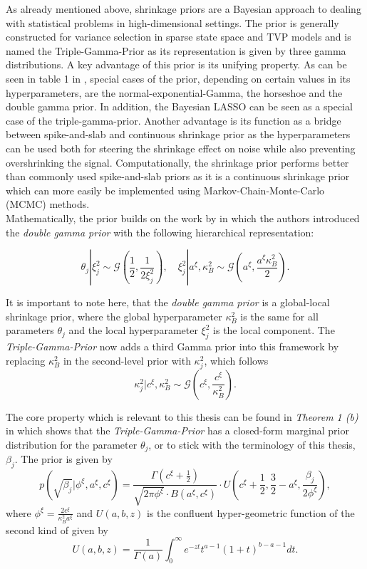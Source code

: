 \documentclass[12pt,a4paper]{article}
\begin{document}
As already mentioned above, shrinkage priors are a Bayesian approach to dealing with statistical problems in high-dimensional settings. The prior is generally constructed for variance selection in sparse state space and TVP models and is named the Triple-Gamma-Prior as its representation is given by three gamma distributions. A key advantage of this prior is its unifying property. As can be seen in table 1 in \textcite{TGP2020}, special cases of the prior, depending on certain values in its hyperparameters, are the normal-exponential-Gamma, the horseshoe and the double gamma prior. In addition, the Bayesian LASSO can be seen as a special case of the triple-gamma-prior. Another advantage is its function as a bridge between spike-and-slab and continuous shrinkage prior as the hyperparameters can be used both for steering the shrinkage effect on noise while also preventing overshrinking the signal. Computationally, the shrinkage prior performs better than commonly used spike-and-slab priors as it is a continuous shrinkage prior which can more easily be implemented using Markov-Chain-Monte-Carlo (MCMC) methods.\\ 

Mathematically, the prior builds on the work by \textcite{BittoFS2019} in which the authors introduced the \textit{double gamma prior} with the following hierarchical representation:

$$\theta_j|\xi^2_j \sim \mathcal{G}\left(\frac{1}{2}, \frac{1}{2\xi^2_j} \right), \quad \xi^2_j | a^\xi, \kappa^2_B \sim \mathcal{G}\left(a^\xi, \frac{a^\xi\kappa_B^2}{2}\right).$$

It is important to note here, that the \textit{double gamma prior} is a global-local shrinkage prior, where the global hyperparameter $\kappa^2_B$ is the same for all parameters $\theta_j$ and the local hyperparameter $\xi^2_j$ is the local component. The \textit{Triple-Gamma-Prior} now adds a third Gamma prior into this framework by replacing $\kappa_B^2$ in the second-level prior with $\kappa_j^2$, which follows
$$\kappa_j^2 | c^\xi, \kappa_B^2 \sim \mathcal{G}\left(c^\xi, \frac{c^\xi}{\kappa_B^2}\right).$$ 

The core property which is relevant to this thesis can be found in \textit{Theorem 1 (b)} in \textcite{TGP2020} which shows that the \textit{Triple-Gamma-Prior} has a closed-form marginal prior distribution for the parameter $\theta_j$, or to stick with the terminology of this thesis, $\beta_j$. The prior is given by
$$p(\sqrt{\beta_j}|\phi^\xi, a^\xi, c^\xi) = \frac{\Gamma(c^\xi + \frac{1}{2})}{\sqrt{2\pi \phi^\xi}\cdot B(a^\xi, c^\xi)}\cdot U\left(c^\xi + \frac{1}{2}, \frac{3}{2}-a^\xi, \frac{\beta_j}{2\phi^\xi}\right),$$
where $\phi^\xi = \frac{2c^\xi}{\kappa^2_Ba^\xi}$ and $U(a,b,z)$ is the confluent hyper-geometric function of the second kind of \textcite{Tricomi1947} given by
$$U(a,b,z) = \frac{1}{\Gamma(a)}\int_0^\infty e^{-zt}t^{a-1}(1+t)^{b-a-1}dt.$$
\end{document}
